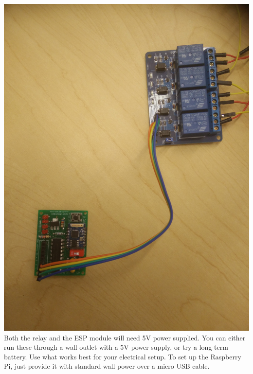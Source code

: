 \includegraphics[scale=0.05]{connection}\\
Both the relay and the ESP module will need 5V power supplied. You can either run these through a wall outlet with a 5V power supply, or try a long-term battery. Use what works best for your electrical setup. To set up the Raspberry Pi, just provide it with standard wall power over a micro USB cable.
